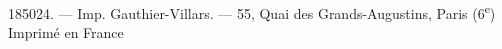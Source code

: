 
185024. --- Imp. Gauthier-Villars. --- 55, Quai des Grands-Augustins, Paris (6\textsuperscript{e})
Imprimé en France

